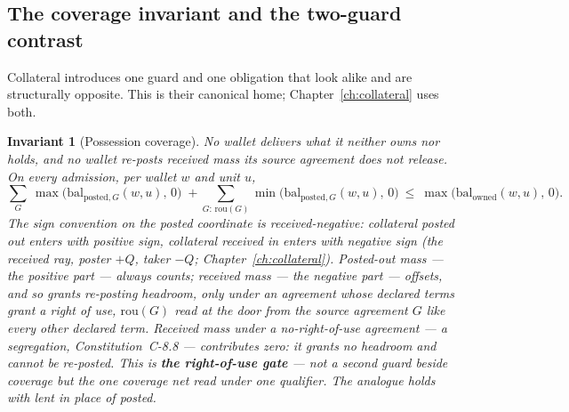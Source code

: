 \documentclass[11pt,a4paper]{article}
\newtheorem{invariant}[definition]{Invariant}
\begin{document}
\subsection{The coverage invariant and the two-guard contrast}

Collateral introduces one guard and one obligation that look alike and are
structurally opposite. This is their canonical home; Chapter~\ref{ch:collateral}
uses both.

\begin{invariant}[Possession coverage]\label{inv:coverage}
No wallet delivers what it neither owns nor holds, and no wallet re-posts received
mass its source agreement does not release. On every admission, per wallet $w$ and
unit $u$,
\[
\sum_{G}\ \max\bigl(\mathrm{bal}_{\mathrm{posted},G}(w,u),\,0\bigr)
\;+\!\!\!\sum_{G:\,\mathrm{rou}(G)}\!\!\!\min\bigl(\mathrm{bal}_{\mathrm{posted},G}(w,u),\,0\bigr)
\ \le\ \max\bigl(\mathrm{bal}_{\mathrm{owned}}(w,u),\,0\bigr).
\]
The sign convention on the posted coordinate is \emph{received-negative}:
collateral posted \emph{out} enters with positive sign, collateral received
\emph{in} enters with negative sign (the received ray, poster $+Q$, taker $-Q$;
Chapter~\ref{ch:collateral}). Posted-out mass --- the positive part --- always
counts; received mass --- the negative part --- offsets, and so grants re-posting
headroom, only under an agreement whose declared terms grant a right of use,
$\mathrm{rou}(G)$ read at the door from the source agreement $G$ like every other
declared term. Received mass under a no-right-of-use agreement --- a segregation,
Constitution~C-8.8 --- contributes zero: it grants no headroom and cannot be
re-posted. This is \textbf{the right-of-use gate} --- not a second guard beside
coverage but the one coverage net read under one qualifier. The analogue holds
with lent in place of posted.
\end{invariant}
\end{document}
